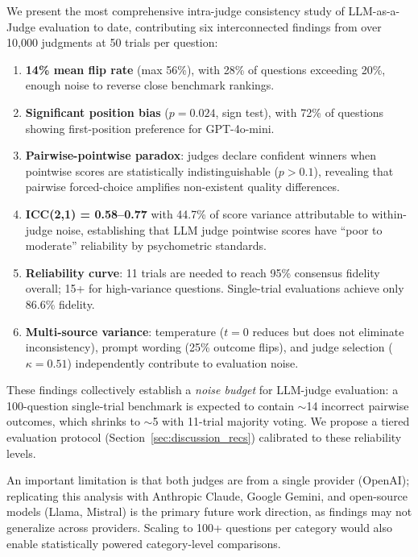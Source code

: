 \documentclass{ijclclp}
\begin{document}
We present the most comprehensive intra-judge consistency study of LLM-as-a-Judge evaluation to date, contributing six interconnected findings from over 10,000 judgments at 50 trials per question:

\begin{enumerate}[nosep]
    \item \textbf{14\% mean flip rate} (max 56\%), with 28\% of questions exceeding 20\%, enough noise to reverse close benchmark rankings.
    \item \textbf{Significant position bias} ($p = 0.024$, sign test), with 72\% of questions showing first-position preference for GPT-4o-mini.
    \item \textbf{Pairwise-pointwise paradox}: judges declare confident winners when pointwise scores are statistically indistinguishable ($p > 0.1$), revealing that pairwise forced-choice amplifies non-existent quality differences.
    \item \textbf{ICC(2,1) = 0.58--0.77} with 44.7\% of score variance attributable to within-judge noise, establishing that LLM judge pointwise scores have ``poor to moderate'' reliability by psychometric standards.
    \item \textbf{Reliability curve}: 11 trials are needed to reach 95\% consensus fidelity overall; 15+ for high-variance questions. Single-trial evaluations achieve only 86.6\% fidelity.
    \item \textbf{Multi-source variance}: temperature ($t=0$ reduces but does not eliminate inconsistency), prompt wording (25\% outcome flips), and judge selection ($\kappa = 0.51$) independently contribute to evaluation noise.
\end{enumerate}

These findings collectively establish a \textit{noise budget} for LLM-judge evaluation: a 100-question single-trial benchmark is expected to contain $\sim$14 incorrect pairwise outcomes, which shrinks to $\sim$5 with 11-trial majority voting. We propose a tiered evaluation protocol (Section~\ref{sec:discussion_recs}) calibrated to these reliability levels.

An important limitation is that both judges are from a single provider (OpenAI); replicating this analysis with Anthropic Claude, Google Gemini, and open-source models (Llama, Mistral) is the primary future work direction, as findings may not generalize across providers. Scaling to 100+ questions per category would also enable statistically powered category-level comparisons.
\end{document}
